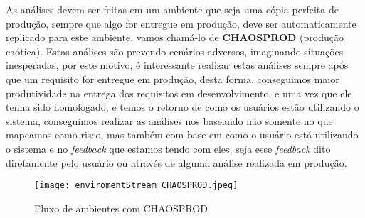       As análises devem ser feitas em um ambiente que seja uma cópia perfeita de
      produção, sempre que algo for entregue em produção, deve ser automaticamente
      replicado para este ambiente, vamos chamá-lo de \textbf{CHAOSPROD} (produção
      caótica). \newline
      Estas análises são prevendo cenários adversos, imaginando situações inesperadas,
      por este motivo, é interessante realizar estas análises sempre após que um
      requisito for entregue em produção, desta forma, conseguimos maior produtividade
      na entrega dos requisitos em desenvolvimento, e uma vez que ele tenha sido
      homologado, e temos o retorno de como os usuários estão utilizando o sistema,
      conseguimos realizar as análises nos baseando não somente no que mapeamos como
      risco, mas também com base em como o usuário está utilizando o sistema e no
      \textit{feedback} que estamos tendo com eles, seja esse \textit{feedback} dito
      diretamente pelo usuário ou através de alguma análise realizada em produção.

      \begin{figure}[!h]
        \centering
        \texttt{[image: enviromentStream\_CHAOSPROD.jpeg]}
        \caption{Fluxo de ambientes com CHAOSPROD}
        \label{Imagem:2}
      \end{figure}

